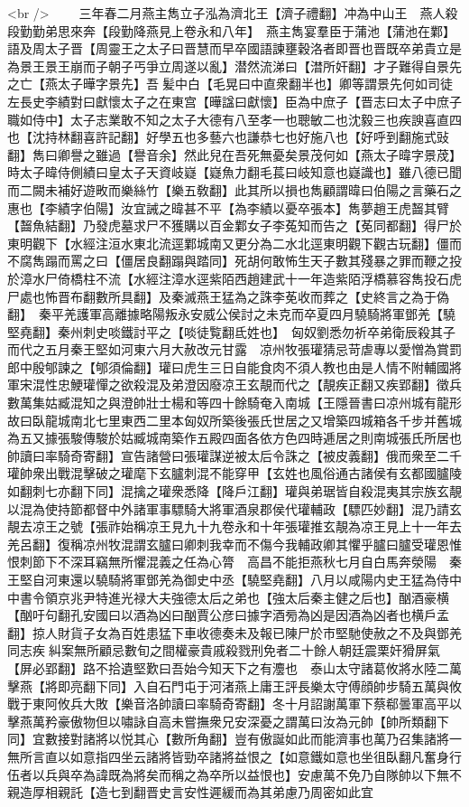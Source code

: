 <br />
　　三年春二月燕主雋立子泓為濟北王【濟子禮翻】冲為中山王　燕人殺段勤勤弟思來奔【段勤降燕見上卷永和八年】　燕主雋宴羣臣于蒲池【蒲池在鄴】語及周太子晋【周靈王之太子曰晋慧而早卒國語諫壅穀洛者即晋也晋既卒弟貴立是為景王景王崩而子朝子丐爭立周遂以亂】潜然流涕曰【澘所奸翻】才子難得自景先之亡【燕太子曄字景先】吾髪中白【毛晃曰中直衆翻半也】卿等謂景先何如司徒左長史李績對曰獻懷太子之在東宫【曄諡曰獻懷】臣為中庶子【晋志曰太子中庶子職如侍中】太子志業敢不知之太子大德有八至孝一也聰敏二也沈毅三也疾諛喜直四也【沈持林翻喜許記翻】好學五也多藝六也謙恭七也好施八也【好呼到翻施式䜴翻】雋曰卿譽之雖過【譽音余】然此兒在吾死無憂矣景茂何如【燕太子暐字景荗】時太子暐侍側績曰皇太子天資岐嶷【嶷魚力翻毛萇曰岐知意也嶷識也】雖八德已聞而二闕未補好遊畋而樂絲竹【樂五敎翻】此其所以損也雋顧謂暐曰伯陽之言藥石之惠也【李績字伯陽】汝宜誡之暐甚不平【為李績以憂卒張本】雋夢趙王虎齧其臂【齧魚結翻】乃發虎墓求尸不獲購以百金鄴女子李菟知而告之【莬同都翻】得尸於東明觀下【水經注洹水東北流逕鄴城南又更分為二水北逕東明觀下觀古玩翻】僵而不腐雋蹋而罵之曰【僵居良翻蹋與踏同】死胡何敢怖生天子數其殘暴之罪而鞭之投於漳水尸倚橋柱不流【水經注漳水逕紫陌西趙建武十一年造紫陌浮橋慕容雋投石虎尸處也怖晋布翻數所具翻】及秦滅燕王猛為之誅李莬收而葬之【史終言之為于偽翻】　秦平羌護軍高離據略陽叛永安威公侯討之未克而卒夏四月驍騎將軍鄧羌【驍堅堯翻】秦州刺史啖鐵討平之【啖徒覧翻氐姓也】　匈奴劉悉勿祈卒弟衛辰殺其子而代之五月秦王堅如河東六月大赦改元甘露　凉州牧張瓘猜忌苛虐專以愛憎為賞罰郎中殷郇諫之【郇須倫翻】瓘曰虎生三日自能食肉不須人教也由是人情不附輔國將軍宋混性忠鯁瓘憚之欲殺混及弟澄因廢凉王玄靚而代之【靚疾正翻又疾郢翻】徵兵數萬集姑臧混知之與澄帥壯士楊和等四十餘騎奄入南城【王隱晉書曰凉州城有龍形故曰臥龍城南北七里東西二里本匈奴所築後張氏世居之又增築四城箱各千步并舊城為五又據張駿傳駿於姑臧城南築作五殿四面各依方色四時逓居之則南城張氏所居也帥讀曰率騎奇寄翻】宣告諸營曰張瓘謀逆被太后令誅之【被皮義翻】俄而衆至二千瓘帥衆出戰混擊破之瓘麾下玄臚刺混不能穿甲【玄姓也風俗通古諸侯有玄都國臚陵如翻刺七亦翻下同】混擒之瓘衆悉降【降戶江翻】瓘與弟琚皆自殺混夷其宗族玄靚以混為使持節都督中外諸軍事驃騎大將軍酒泉郡侯代瓘輔政【驃匹妙翻】混乃請玄靚去凉王之號【張祚始稱凉王見九十九卷永和十年張瓘推玄靚為凉王見上十一年去羌呂翻】復稱凉州牧混謂玄臚曰卿刺我幸而不傷今我輔政卿其懼乎臚曰臚受瓘恩惟恨刺節下不深耳竊無所懼混義之任為心膂　高昌不能拒燕秋七月自白馬奔滎陽　秦王堅自河東還以驍騎將軍鄧羌為御史中丞【驍堅堯翻】八月以咸陽内史王猛為侍中中書令領京兆尹特進光禄大夫強德太后之弟也【強太后秦主健之后也】酗酒豪横【酗吁句翻孔安國曰以酒為凶曰酗賈公彦曰據字酒㫄為凶是因酒為凶者也横戶孟翻】掠人財貨子女為百姓患猛下車收德奏未及報已陳尸於市堅馳使赦之不及與鄧羌同志疾糾案無所顧忌數旬之間權豪貴戚殺戮刑免者二十餘人朝廷震栗奸猾屏氣【屏必郢翻】路不拾遺堅歎曰吾始今知天下之有灋也　泰山太守諸葛攸將水陸二萬擊燕【將即亮翻下同】入自石門屯于河渚燕上庸王評長樂太守傅顔帥步騎五萬與攸戰于東阿攸兵大敗【樂音洛帥讀曰率騎奇寄翻】冬十月詔謝萬軍下蔡郗曇軍高平以擊燕萬矜豪傲物但以嘯詠自高未嘗撫衆兄安深憂之謂萬曰汝為元帥【帥所類翻下同】宜數接對諸將以悦其心【數所角翻】豈有傲誕如此而能濟事也萬乃召集諸將一無所言直以如意指四坐云諸將皆勁卒諸將益恨之【如意鐵如意也坐徂臥翻凡奮身行伍者以兵與卒為諱既為將矣而稱之為卒所以益恨也】安慮萬不免乃自隊帥以下無不親造厚相親託【造七到翻晋史言安性遲緩而為其弟慮乃周密如此宜